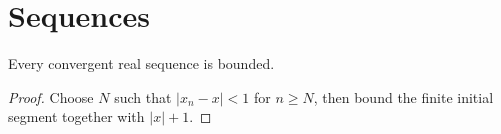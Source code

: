 \documentclass{article}
\begin{document}
\section{Sequences}
\begin{lemma}
Every convergent real sequence is bounded.
\end{lemma}
\begin{proof}
Choose $N$ such that $|x_n-x|<1$ for $n\ge N$, then bound the finite initial
segment together with $|x|+1$.
\end{proof}
\end{document}
